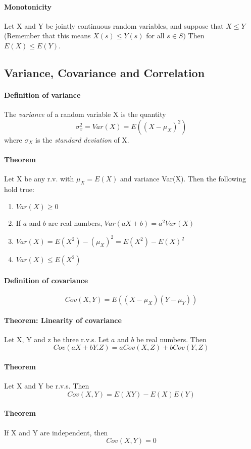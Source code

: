 \documentclass[11pt]{article}
\newcommand{\ti}[1]{\textit{#1}}
\begin{document}
\paragraph{Monotonicity} Let X and Y be jointly continuous random variables, and suppose that $X \leq Y$ (Remember that this means $X(s) \leq Y(s)$ for all $s\in S)$ Then $E(X) \leq E(Y)$.
\subsection{Variance, Covariance and Correlation}
\paragraph{Definition of variance} The \ti{variance} of a random variable X is the quantity
$$\sigma^2_x = Var(X) = E((X - \mu_X)^2)$$
where $\sigma_X$ is the \ti{standard deviation} of X.
\paragraph{Theorem} Let X be any r.v. with $\mu_X = E(X)$ and variance Var(X). Then the following hold true:
\begin{enumerate}
	\item $Var(X) \geq 0$
	\item If $a$ and $b$ are real numbers, $Var(aX+b) = a^2Var(X)$
	\item $Var(X) = E(X^2) - (\mu_X)^2 = E(X^2) - E(X)^2$
	\item $Var(X) \leq E(X^2)$
\end{enumerate}
\paragraph{Definition of covariance} $$Cov(X,Y) = E((X - \mu_X)(Y - \mu_Y))$$
\paragraph{Theorem: Linearity of covariance} Let X, Y and z be three r.v.s. Let $a$ and $b$ be real numbers. Then
$$Cov(aX + bY. Z) = aCov(X,Z) + bCov(Y,Z)$$
\paragraph{Theorem} Let X and Y be r.v.s. Then
$$Cov(X,Y) = E(XY) - E(X)E(Y)$$
\paragraph{Theorem} If X and Y are independent, then $$Cov(X,Y) = 0$$
\end{document}
